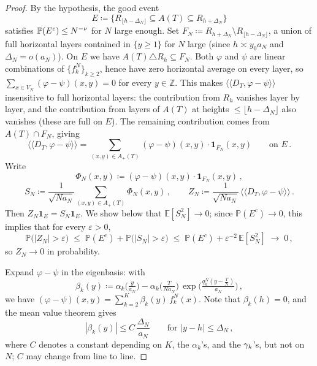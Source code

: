 \documentclass[11pt,a4paper,reqno]{amsart}
\theoremstyle{definition}
\newcommand{\bbE}{{\ensuremath{\mathbb E}} }
\newcommand{\bbP}{{\ensuremath{\mathbb P}} }
\newcommand{\bbZ}{{\ensuremath{\mathbb Z}} }
\newcommand{\laa}{\langle \! \langle}
\newcommand{\raa}{\rangle \! \rangle}
\let\a=\alpha \let\b=\beta   \let\d=\delta  \let\e=\varepsilon
\begin{document}
\begin{proof}
By the hypothesis, the good event
	\[ E \coloneqq \{ R_{\lfloor h - \Delta_N\rfloor} \subseteq A(T) \subseteq R_{h + \Delta_N} \} \]
satisfies $\bbP(E^c) \leq N^{-\n}$ for $N$ large enough. Set $F_N \coloneqq R_{h + \Delta_N} \setminus R_{\lfloor h - \Delta_N\rfloor}$, a union of full horizontal layers contained in $\{y \geq 1\}$ for $N$ large (since $h \asymp y_0 a_N$ and $\Delta_N = o(a_N)$). On $E$ we have $A(T) \triangle R_h \subseteq F_N$. Both $\varphi$ and $\psi$ are linear combinations of $\{f_k^N\}_{k \geq 2}$, hence have zero horizontal average on every layer, so $\sum_{x \in V_N}(\varphi - \psi)(x, y) = 0$ for every $y \in \bbZ$. This makes $\laa D_T, \varphi - \psi\raa$ insensitive to full horizontal layers: the contribution from $R_h$ vanishes layer by layer, and the contribution from layers of $A(T)$ at heights $\leq \lfloor h - \Delta_N\rfloor$ also vanishes (these are full on $E$). The remaining contribution comes from $A(T) \cap F_N$, giving
	\[ \laa D_T, \varphi - \psi \raa
	= \sum_{(x,y) \in A_+(T)} (\varphi - \psi)(x,y) \cdot \mathbf{1}_{F_N}(x,y)
	\qquad \text{on } E\,. \]
Write
	\[ \Phi_N(x, y) \coloneqq (\varphi - \psi)(x, y) \cdot \mathbf{1}_{F_N}(x, y)\,, \]
	\[ S_N \coloneqq \frac{1}{\sqrt{Na_N}} \sum_{(x, y) \in A_+(T)} \Phi_N(x, y)\,, \qquad
	Z_N \coloneqq \frac{1}{\sqrt{Na_N}}\,\laa D_T, \varphi - \psi\raa\,. \]
Then $Z_N \mathbf{1}_E = S_N \mathbf{1}_E$. We show below that $\bbE[S_N^2] \to 0$; since $\bbP(E^c) \to 0$, this implies that for every $\varepsilon > 0$,
\begin{equation}\label{eq:Zn-decomp}
	\bbP\big(|Z_N| > \varepsilon\big) \;\leq\; \bbP(E^c) + \bbP\big(|S_N| > \varepsilon\big)
	\;\leq\; \bbP(E^c) + \varepsilon^{-2}\,\bbE[S_N^2] \;\longrightarrow\; 0\,,
\end{equation}
so $Z_N \to 0$ in probability.

Expand $\varphi - \psi$ in the eigenbasis: with
	\begin{equation}\label{eq:betak}
	\b_k(y) \coloneqq \a_k \big( \tfrac{y}{a_N} \big) - \a_k \big( \tfrac{T}{Na_N} \big) \, \exp \Big( \tfrac{q_k^N (y - \tfrac{T}{N} ) }{ a_N } \Big) \,,
	\end{equation}
we have $(\varphi - \psi)(x,y) = \sum_{k=2}^K \b_k(y)\, f_k^N(x)$. Note that $\b_k(h) = 0$, and the mean value theorem gives
	\begin{equation}\label{eq:betabd}
	|\b_k(y)| \leq C\,\frac{\Delta_N}{a_N} \qquad \text{for } |y - h| \leq \Delta_N\,,
	\end{equation}
where $C$ denotes a constant depending on $K$, the $\a_k$'s, and the $\gamma_k$'s, but not on $N$; $C$ may change from line to line.


\end{proof}
\end{document}
